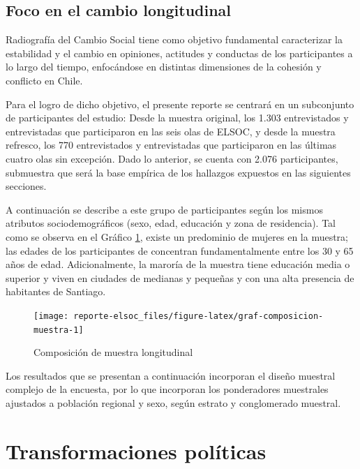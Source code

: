\documentclass[
  12pt,
]{book}
\begin{document}
\hypertarget{foco-en-el-cambio-longitudinal}{%
\section{Foco en el cambio longitudinal}\label{foco-en-el-cambio-longitudinal}}

Radiografía del Cambio Social tiene como objetivo fundamental caracterizar la estabilidad y el cambio en opiniones, actitudes y conductas de los participantes a lo largo del tiempo, enfocándose en distintas dimensiones de la cohesión y conflicto en Chile.

Para el logro de dicho objetivo, el presente reporte se centrará en un subconjunto de participantes del estudio: Desde la muestra original, los 1.303 entrevistados y entrevistadas que participaron en las seis olas de ELSOC, y desde la muestra refresco, los 770 entrevistados y entrevistadas que participaron en las últimas cuatro olas sin excepción. Dado lo anterior, se cuenta con 2.076 participantes, submuestra que será la base empírica de los hallazgos expuestos en las siguientes secciones.

A continuación se describe a este grupo de participantes según los mismos atributos sociodemográficos (sexo, edad, educación y zona de residencia). Tal como se observa en el Gráfico \ref{fig:graf-composicion-muestra}, existe un predominio de mujeres en la muestra; las edades de los participantes de concentran fundamentalmente entre los 30 y 65 años de edad. Adicionalmente, la maroría de la muestra tiene educación media o superior y viven en ciudades de medianas y pequeñas y con una alta presencia de habitantes de Santiago.

\begin{figure}

{\centering \texttt{[image: reporte-elsoc\_files/figure-latex/graf-composicion-muestra-1]} 

}

\caption{Composición de muestra longitudinal}\label{fig:graf-composicion-muestra}
\end{figure}

Los resultados que se presentan a continuación incorporan el diseño muestral complejo de la encuesta, por lo que incorporan los ponderadores muestrales ajustados a población regional y sexo, según estrato y conglomerado muestral.

\hypertarget{transformaciones-poluxedticas}{%
\chapter{Transformaciones políticas}\label{transformaciones-poluxedticas}}
\end{document}
